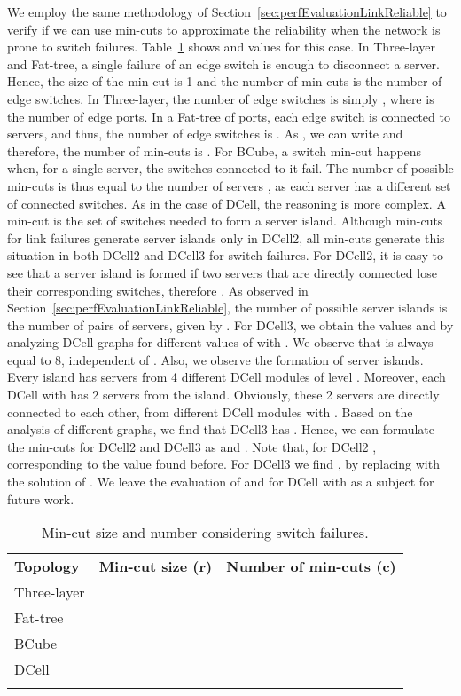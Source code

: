 We employ the same methodology of Section~\ref{sec:perfEvaluationLinkReliable} to verify if we can use min-cuts to approximate the reliability when the network is prone to switch failures. Table~\ref{tab:cuts_switch} shows  and  values for this case. In Three-layer and Fat-tree, a single failure of an edge switch is enough to disconnect a server. Hence, the size of the min-cut is 1 and the number of min-cuts is the number of edge switches. 
In Three-layer, the number of edge switches is simply , where  is the number of edge ports.
In a Fat-tree of  ports, each edge switch is connected to  servers, and thus, the number of edge switches is . As , we can write  and therefore, the number of min-cuts is . For BCube, a switch min-cut happens when, for a single server, the  switches connected to it fail. The number of possible min-cuts is thus equal to the number of servers , as each server has a different set of connected switches.
As in the case of DCell, the reasoning is more complex. A min-cut is the set of switches needed to form a server island.
Although min-cuts for link failures generate server islands only in DCell2, all min-cuts generate this situation in both DCell2 and DCell3 for switch failures. For DCell2, it is easy to see that a server island is formed if two servers that are directly connected lose their corresponding switches, therefore . As observed in Section~\ref{sec:perfEvaluationLinkReliable}, the number of possible server islands is the number of pairs of servers, given by . For DCell3, we obtain the values  and  by analyzing DCell graphs for different values of  with . We observe that  is always equal to 8, independent of . Also, we observe the formation of server islands. Every island has servers from 4 different DCell modules of level . Moreover, each DCell with  has 2 servers from the island. Obviously, these 2 servers are directly connected to each other, from different DCell modules with . Based on the analysis of different graphs, we find that DCell3 has . Hence, we can formulate the min-cuts for DCell2 and DCell3 as  and . Note that, for DCell2 , corresponding to the value found before. 
For DCell3 we find , by replacing  with the solution of . We leave the evaluation of  and  for DCell with  as a subject for future work.
\begin{table}[hb]
\caption{Min-cut size and number considering switch failures.}
\label{tab:cuts_switch}
\begin{tabular}{lll}
\hline\noalign{\smallskip}
\textbf{Topology} &\textbf{Min-cut size (r)} &\textbf{Number of min-cuts (c)}\\
\noalign{\smallskip}\hline\noalign{\smallskip}
Three-layer & & \\
Fat-tree & & \\
BCube & & \\
DCell  &  \ & \\
\noalign{\smallskip}\hline
\end{tabular}
\end{table}
